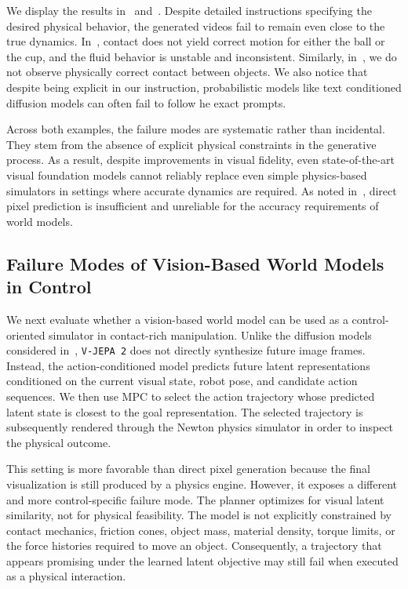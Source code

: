 \documentclass{article}
\begin{document}
We display the results in~ and~. Despite detailed instructions specifying the desired physical behavior, the generated videos fail to remain even close to the true dynamics. In~, contact does not yield correct motion for either the ball or the cup, and the fluid behavior is unstable and inconsistent. Similarly, in~, we do not observe physically correct contact between objects. We also notice that despite being explicit in our instruction, probabilistic models like text conditioned diffusion models can often fail to follow he exact prompts. 

Across both examples, the failure modes are systematic rather than incidental. They stem from the absence of explicit physical constraints in the generative process. As a result, despite improvements in visual fidelity, even state-of-the-art visual foundation models cannot reliably replace even simple physics-based simulators in settings where accurate dynamics are required. As noted in~\cite{o2025vdaworld}, direct pixel prediction is insufficient and unreliable for the accuracy requirements of world models.

\subsection{Failure Modes of Vision-Based World Models in Control}
\label{subsec:vjepa_control_results}

We next evaluate whether a vision-based world model can be used as a control-oriented simulator in contact-rich manipulation. 
Unlike the diffusion models considered in~, \texttt{V-JEPA 2} does not directly synthesize future image frames. 
Instead, the action-conditioned model predicts future latent representations conditioned on the current visual state, robot pose, and candidate action sequences. 
We then use MPC to select the action trajectory whose predicted latent state is closest to the goal representation. 
The selected trajectory is subsequently rendered through the Newton physics simulator in order to inspect the physical outcome.

This setting is more favorable than direct pixel generation because the final visualization is still produced by a physics engine. 
However, it exposes a different and more control-specific failure mode. The planner optimizes for visual latent similarity, not for physical feasibility. 
The model is not explicitly constrained by contact mechanics, friction cones, object mass, material density, torque limits, or the force histories required to move an object. 
Consequently, a trajectory that appears promising under the learned latent objective may still fail when executed as a physical interaction.
\end{document}
